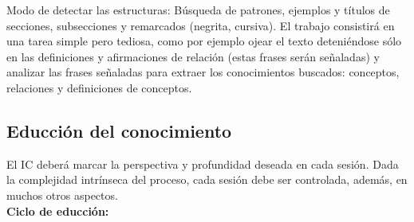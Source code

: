 \documentclass[12pt]{article}
\begin{document}
Modo de detectar las estructuras: Búsqueda de patrones, ejemplos y títulos de secciones, subsecciones y remarcados (negrita, cursiva). El trabajo consistirá en una tarea simple pero tediosa, como por ejemplo ojear el texto deteniéndose sólo en las definiciones y afirmaciones de relación (estas frases serán señaladas) y analizar las frases señaladas para extraer los conocimientos buscados: conceptos, relaciones y definiciones de conceptos.

\subsection{Educción del conocimiento}
El IC deberá marcar la perspectiva y profundidad deseada en cada sesión. Dada la complejidad intrínseca del proceso, cada sesión debe ser controlada, además, en muchos otros aspectos.\\
\textbf{Ciclo de educción:}
\end{document}
